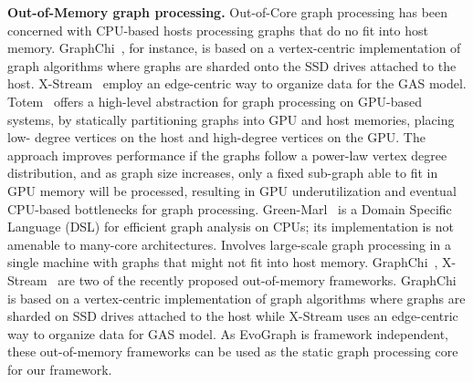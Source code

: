 \textbf{Out-of-Memory graph processing.} Out-of-Core graph processing has been concerned with CPU-based hosts processing graphs that do no fit into host memory. GraphChi~\cite{chi}, for instance, is based on a vertex-centric implementation of graph algorithms where graphs are sharded onto the SSD drives attached to the host. X-Stream~\cite{xstream} employ an edge-centric way to organize data for the GAS model. Totem~\cite{totem} offers a high-level abstraction for graph processing on GPU-based systems, by statically partitioning graphs into GPU and host memories, placing low- degree vertices on the host and high-degree vertices on the GPU. The approach improves performance if the graphs follow a power-law vertex degree distribution, and as graph size increases, only a fixed sub-graph able to fit in GPU memory will be processed, resulting in GPU underutilization and eventual CPU-based bottlenecks for graph processing. Green-Marl~\cite{green} is a Domain Specific Language (DSL) for efficient graph analysis on CPUs; its implementation is not amenable to many-core architectures.
Involves large-scale graph processing in a single machine with graphs that might not fit into host memory. GraphChi~\cite{chi},  X-Stream~\cite{xstream} are two of the recently proposed out-of-memory frameworks. GraphChi is based on a vertex-centric implementation of graph algorithms where graphs are sharded on SSD drives attached to the host while X-Stream uses an edge-centric way to organize data for GAS model. As EvoGraph is framework independent, these out-of-memory frameworks can be used as the static graph processing core for our framework.


